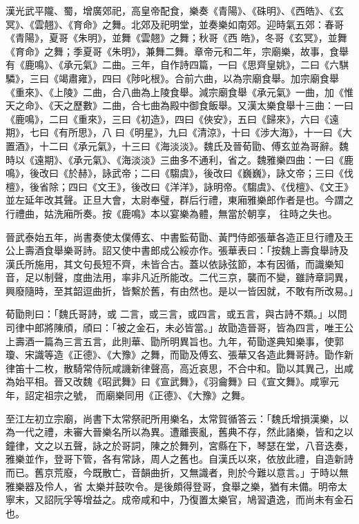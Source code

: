 \begin{pinyinscope}
 漢光武平隴、蜀，增廣郊祀，高皇帝配食，樂奏《青陽》、《硃明》、《西皓》、《玄冥》、《雲翹》、《育命》之舞。北郊及祀明堂，並奏樂如南郊。迎時氣五郊：春哥《青陽》，夏哥《朱明》，並舞《雲翹》之舞；秋哥《西
 皓》，冬哥《玄冥》，並舞《育命》之舞；季夏哥《朱明》，兼舞二舞。章帝元和二年，宗廟樂，故事，食舉有《鹿鳴》、《承元氣》二曲。三年，自作詩四篇，一曰《思齊皇姚》，二曰《六騏驎》，三曰《竭肅雍》，四曰《陟叱根》。合前六曲，以為宗廟食舉。加宗廟食舉《重來》、《上陵》二曲，合八曲為上陵食舉。減宗廟食舉《承元氣》一曲，加《惟天之命》、《天之歷數》二曲，合七曲為殿中御食飯舉。又漢太樂食舉十三曲：一曰《鹿鳴》，二曰《重來》，三曰《初造》，四曰《俠安》，五曰《歸來》，六曰《遠期》，七曰《有所思》，八
 曰《明星》，九曰《清涼》，十曰《涉大海》，十一曰《大置酒》，十二曰《承元氣》，十三曰《海淡淡》。魏氏及晉荀勖、傅玄並為哥辭。魏時以《遠期》、《承元氣》、《海淡淡》三曲多不通利，省之。魏雅樂四曲：一曰《鹿鳴》，後改曰《於赫》，詠武帝；二曰《騶虞》，後改曰《巍巍》，詠文帝；三曰《伐檀》，後省除；四曰《文王》，後改曰《洋洋》，詠明帝。《騶虞》、《伐檀》、《文王》並左延年改其聲。正旦大會，太尉奉璧，群后行禮，東廂雅樂郎作者是也。今謂之行禮曲，姑洗廂所奏。按《鹿鳴》本以宴樂為體，無當於朝享，
 往時之失也。



 晉武泰始五年，尚書奏使太僕傅玄、中書監荀勖、黃門侍郎張華各造正旦行禮及王公上壽酒食舉樂哥詩。詔又使中書郎成公綏亦作。張華表曰：「按魏上壽食舉詩及漢氏所施用，其文句長短不齊，未皆合古。蓋以依詠弦節，本有因循，而識樂知音，足以制聲，度曲法用，率非凡近所能改。二代三京，襲而不變，雖詩章詞異，興廢隨時，至其韶逗曲折，皆繫於舊，有由然也。是以一皆因就，不敢有所改易。」



 荀勖則曰：「魏氏哥詩，或
 二言，或三言，或四言，或五言，與古詩不類。」以問司律中郎將陳頎，頎曰：「被之金石，未必皆當。」故勖造晉哥，皆為四言，唯王公上壽酒一篇為三言五言，此則華、勖所明異旨也。九年，荀勖遂典知樂事，使郭瓊、宋識等造《正德》、《大豫》之舞，而勖及傅玄、張華又各造此舞哥詩。勖作新律笛十二枚，散騎常侍阮咸譏新律聲高，高近哀思，不合中和。勖以其異己，出咸為始平相。晉又改魏《昭武舞》曰《宣武舞》，《羽龠舞》曰《宣文舞》。咸寧元年，詔定祖宗之號，
 而廟樂同用《正德》、《大豫》之舞。



 至江左初立宗廟，尚書下太常祭祀所用樂名，太常賀循答云：「魏氏增損漢樂，以為一代之禮，未審大晉樂名所以為異。遭離喪亂，舊典不存，然此諸樂，皆和之以鐘律，文之以五聲，詠之於哥詞，陳之於舞列，宮縣在下，琴瑟在堂，八音迭奏，雅樂並作，登哥下管，各有常詠，周人之舊也。自漢氏以來，依放此禮，自造新詩而已。舊京荒廢，今既散亡，音韻曲折，又無識者，則於今難以意言。」于時以無雅樂器及伶人，省
 太樂并鼓吹令。是後頗得登哥，食舉之樂，猶有未備。明帝太寧末，又詔阮孚等增益之。成帝咸和中，乃復置太樂官，鳩習遺逸，而尚未有金石也。




\end{pinyinscope}
